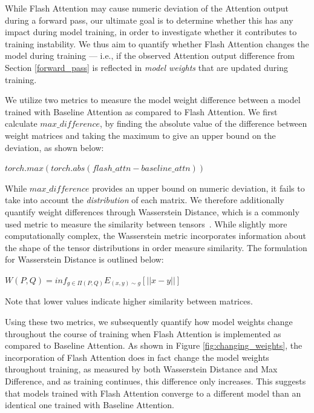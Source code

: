 While Flash Attention may cause numeric deviation of the Attention output during a forward pass, our ultimate goal is to determine whether this has any impact during model training, in order to investigate whether it contributes to training instability. We thus aim to quantify whether Flash Attention changes the model during training --- i.e., if the observed Attention output difference from Section \ref{forward_pass} is reflected in \textit{model weights} that are updated during training.

We utilize two metrics to measure the model weight difference between a model trained with Baseline Attention as compared to Flash Attention. We first calculate $max\_difference$, by finding the absolute value of the difference between weight matrices and taking the maximum to give an upper bound on the deviation, as shown below:

\begin{center}
    $torch.max(torch.abs(flash\_attn - baseline\_attn))$
\end{center}

While $max\_difference$ provides an upper bound on numeric deviation, it fails to take into account the \textit{distribution} of each matrix. We therefore additionally quantify weight differences through Wasserstein Distance, which is a commonly used metric to measure the similarity between tensors~\cite{Panaretos_2019, harma2023accuracy}. While slightly more computationally complex, the Wasserstein metric incorporates information about the shape of the tensor distributions in order measure similarity. The formulation for Wasserstein Distance is outlined below:

\begin{center}
    $W(P,Q) = inf_{g \in \Pi (P,Q)} E_{(x,y) \sim g}[||x-y||]$
\end{center}

Note that lower values indicate higher similarity between matrices.

Using these two metrics, we subsequently quantify how model weights change throughout the course of training when Flash Attention is implemented as compared to Baseline Attention. As shown in Figure \ref{fig:changing_weights}, the incorporation of Flash Attention does in fact change the model weights throughout training, as measured by both Wasserstein Distance and Max Difference, and as training continues, this difference only increases. This suggests that models trained with Flash Attention converge to a different model than an identical one trained with Baseline Attention.

